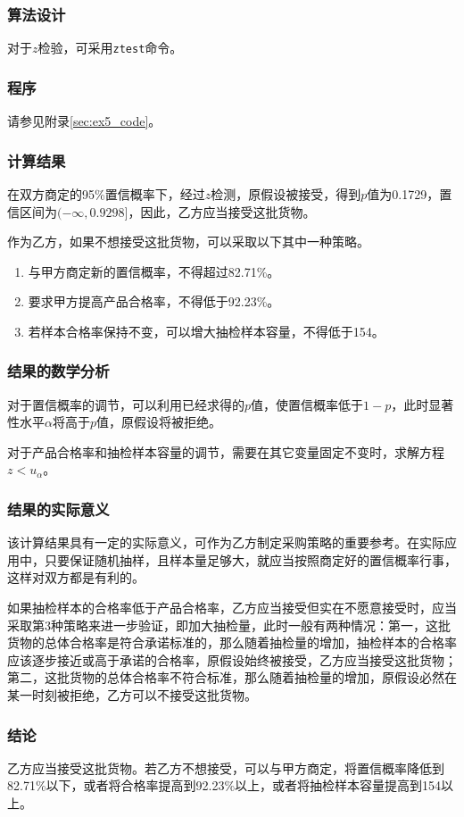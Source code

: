 \subsubsection{算法设计}

对于$z$检验，可采用\texttt{ztest}命令。

\subsubsection{程序}

请参见附录\ref{sec:ex5_code}。

\subsubsection{计算结果}

在双方商定的95\%置信概率下，经过$z$检测，原假设被接受，得到$p$值为0.1729，置信区间为$(-\infty,0.9298]$，因此，乙方应当接受这批货物。

作为乙方，如果不想接受这批货物，可以采取以下其中一种策略。
\begin{enumerate}
    \item 与甲方商定新的置信概率，不得超过82.71\%。
    \item 要求甲方提高产品合格率，不得低于92.23\%。
    \item 若样本合格率保持不变，可以增大抽检样本容量，不得低于154。
\end{enumerate}

\subsubsection{结果的数学分析}

对于置信概率的调节，可以利用已经求得的$p$值，使置信概率低于$1-p$，此时显著性水平$\alpha$将高于$p$值，原假设将被拒绝。

对于产品合格率和抽检样本容量的调节，需要在其它变量固定不变时，求解方程$z < u_\alpha$。

\subsubsection{结果的实际意义}

该计算结果具有一定的实际意义，可作为乙方制定采购策略的重要参考。在实际应用中，只要保证随机抽样，且样本量足够大，就应当按照商定好的置信概率行事，这样对双方都是有利的。

如果抽检样本的合格率低于产品合格率，乙方应当接受但实在不愿意接受时，应当采取第3种策略来进一步验证，即加大抽检量，此时一般有两种情况：第一，这批货物的总体合格率是符合承诺标准的，那么随着抽检量的增加，抽检样本的合格率应该逐步接近或高于承诺的合格率，原假设始终被接受，乙方应当接受这批货物；第二，这批货物的总体合格率不符合标准，那么随着抽检量的增加，原假设必然在某一时刻被拒绝，乙方可以不接受这批货物。

\subsubsection{结论}

乙方应当接受这批货物。若乙方不想接受，可以与甲方商定，将置信概率降低到82.71\%以下，或者将合格率提高到92.23\%以上，或者将抽检样本容量提高到154以上。
